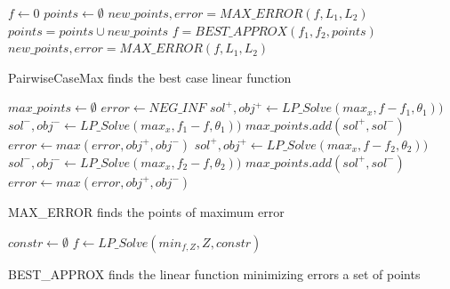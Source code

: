 \incmargin{1.5em}
\linesnumbered
\begin{algorithm}[!ht]
\dontprintsemicolon
{}
$f \gets 0$\;
$points \gets \emptyset$\;
$new\_points, error = MAX\_ERROR(f, L_1,L_2)$\;
 {
	$points = points \cup new\_points$\;
	$f = BEST\_APPROX(f_1,f_2,points)$\;
	$new\_points, error = MAX\_ERROR(f, L_1,L_2)$\;}
\;
\caption{{\sc PairwiseCaseMax} finds the best case linear function}
\label{alg:glo}
\end{algorithm}
\decmargin{1.5em}

\incmargin{1.5em}
\linesnumbered
\begin{algorithm}[!ht]
\dontprintsemicolon
{}
$max\_points \gets \emptyset$\;
$error \gets NEG\_INF$\;
 {
	$sol^+, obj^+ \gets LP\_Solve(max _x, f-f_1,\theta_1) )$\;
	$sol^-, obj^- \gets LP\_Solve(max _x, f_1-f,\theta_1) )$\;
	$max\_points.add(sol^+,sol^-)$\; 	$error \gets max(error, obj^+, obj^-)$\; 
	}
 {
	$sol^+, obj^+ \gets LP\_Solve(max _x, f-f_2,\theta_2) )$\;
	$sol^-, obj^- \gets LP\_Solve(max _x, f_2-f,\theta_2) )$\;
	$max\_points.add(sol^+,sol^-)$\; 	$error \gets max(error, obj^+, obj^-)$\; 
	}\;
\caption{{\sc MAX\_ERROR} finds the points of maximum error}
\label{alg:maxError}
\end{algorithm}
\decmargin{1.5em}

\incmargin{1.5em}
\linesnumbered
\begin{algorithm}[!ht]
\dontprintsemicolon
{}
$constr \gets \emptyset$\;
\;
$f \gets LP\_Solve(min_{f,Z}, Z, constr)$\;	
\;
\caption{{\sc BEST\_APPROX} finds the linear function minimizing errors a set of points}
\label{alg:relaxApprox}
\end{algorithm}
\decmargin{1.5em}

